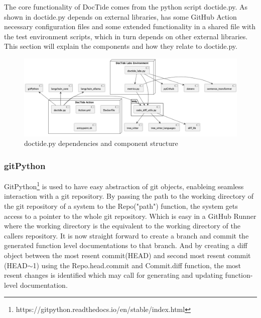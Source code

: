 The core functionality of DocTide comes from the python script doctide.py. As shown in  doctide.py depends on external libraries, has some GitHub Action necessary configuration files and some extended functionality in a shared file with the test environment scripts, which in turn depends on other external libraries. This section will explain the components and how they relate to doctide.py.

\begin{figure}[H]
\centering
\includegraphics[width=0.7\linewidth]{Figures/component_diagram.png}
\caption{doctide.py dependencies and component structure}
\label{fig:components}
\end{figure}
\subsubsection*{gitPython}
GitPython\footnote{https://gitpython.readthedocs.io/en/stable/index.html} is used to have easy abstraction of git objects, enableing seamless interaction with a git repository. By passing the path to the working directory of the git repository of a system to the Repo("path") function, the system gets access to a pointer to the whole git repository. Which is easy in a GitHub Runner where the working directory is the equivalent to the working directory of the callers repository. It is now straight forward to create a branch and commit the generated function level documentations to that branch. And by creating a diff object between the most resent commit(HEAD) and second most resent commit (HEAD\(\sim \)1) using the Repo.head.commit and Commit.diff function, the most resent changes is identified which may call for generating and updating function-level documentation.
